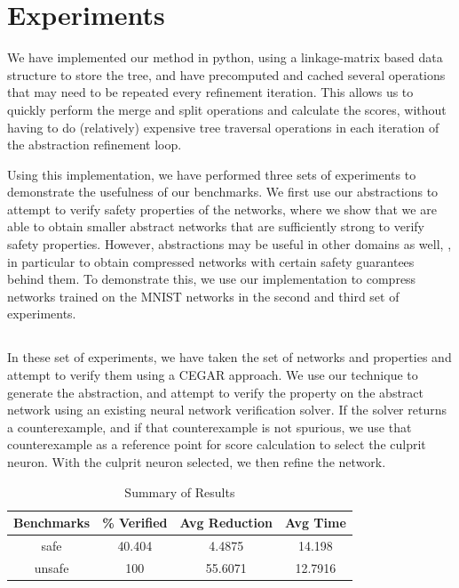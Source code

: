 \section{Experiments}

We have implemented our method in python, using a linkage-matrix based
data structure to store the tree, and have precomputed and cached several
operations that may need to be repeated every refinement iteration. This allows
us to quickly perform the merge and split operations and calculate the
scores,  without having to do (relatively)
expensive tree traversal operations in each iteration of the abstraction
refinement loop. 

Using this implementation, we have performed three sets of experiments to
demonstrate the usefulness of our benchmarks. We first use our abstractions to
attempt to verify safety properties of the \acasxu networks, where we
show that we are able to obtain smaller abstract networks that are sufficiently
strong to verify safety properties. However, abstractions may be useful in other
domains as well, , in particular to
obtain compressed networks with certain safety guarantees behind them. To
demonstrate this, we use our implementation to compress networks trained on the
MNIST networks in the second and third set of experiments. 


\subsection{\acasxu}

In these set of experiments, we have taken the \acasxu set of
networks  and
properties and attempt to verify them using a CEGAR approach. We use our
technique to generate the abstraction, and attempt to verify the property on the
abstract network using an existing neural network verification solver. If the
solver returns a counterexample, and if that counterexample is not spurious, we
use that counterexample as a reference point for score calculation  to select the culprit neuron.  With the culprit
neuron selected, we then refine the network.

\begin{table}
\begin{tabular}{ |c|c|c|c| }
\hline
Benchmarks &    \% Verified &  Avg Reduction &  Avg Time \\
\hline
safe       &        40.404  &         4.4875 &   14.198  \\
unsafe     &       100      &        55.6071 &   12.7916 \\
\hline
\end{tabular}
\caption{Summary of \acasxu Results}
\label{t:acas-summary}
\end{table}


